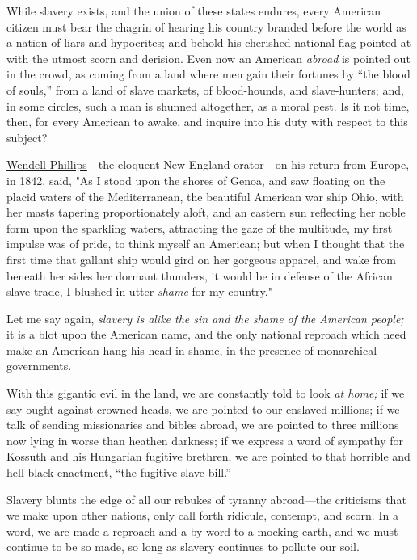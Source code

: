 While slavery exists, and the union of these states endures, every
American citizen must bear the chagrin of hearing his country branded
before the world as a nation of liars and hypocrites; and behold his
cherished national flag pointed at with the utmost scorn and derision.
Even now an American \emph{abroad} is pointed out in the crowd, as
coming from a land where men gain their fortunes by ``the blood of
souls,'' from a land of slave markets, of blood-hounds, and
slave-hunters; and, in some circles, such a man is shunned altogether,
as a moral pest. Is it not time, then, for every American to awake, and
inquire into his duty with respect to this subject?

{\href{/wiki/Author:Wendell_Phillips}{Wendell Phillips}}---the eloquent
New England orator---on his return from Europe, in 1842, said, "As I
stood upon the shores of Genoa, and saw floating on the placid waters of
the Mediterranean, the beautiful American war ship Ohio, with her masts
tapering proportionately aloft, and an eastern sun reflecting her noble
form upon the sparkling waters, attracting the gaze of the multitude, my
first impulse was of pride, to think myself an American; but when I
thought that the first time that gallant ship would gird on her gorgeous
apparel, and wake from beneath her sides her dormant thunders, it would
be in defense of the African slave trade, I blushed in utter
\emph{shame} for my country."

Let me say again, \emph{slavery is alike the sin and the shame of the
American people;} it is a blot upon the American name, and the only
national reproach which need make an American hang his head in shame, in
the presence of monarchical governments.

With this gigantic evil in the land, we are constantly told to look
{\protect\hypertarget{439}{}{}}\emph{at home;} if we say ought against
crowned heads, we are pointed to our enslaved millions; if we talk of
sending missionaries and bibles abroad, we are pointed to three millions
now lying in worse than heathen darkness; if we express a word of
sympathy for Kossuth and his Hungarian fugitive brethren, we are pointed
to that horrible and hell-black enactment, ``the fugitive slave bill.''

Slavery blunts the edge of all our rebukes of tyranny abroad---the
criticisms that we make upon other nations, only call forth ridicule,
contempt, and scorn. In a word, we are made a reproach and a by-word to
a mocking earth, and we must continue to be so made, so long as slavery
continues to pollute our soil.

